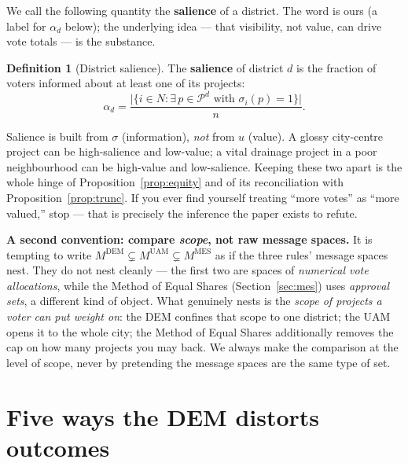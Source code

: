 \documentclass[11pt,letterpaper]{article}
\theoremstyle{definition}
\newtheorem{definition}{Definition}[section]
\theoremstyle{plain}
\theoremstyle{remark}
\newcommand{\Pset}{\mathcal{P}}
\newcommand{\agents}{N}
\newcommand{\DEM}{\text{DEM}}
\newcommand{\UAM}{\text{UAM}}
\newcommand{\MES}{\text{MES}}
\newcommand{\salience}{\alpha}
\begin{document}
\begin{naming}
We call the following quantity the \textbf{salience} of a district. The word is ours (a label for
$\salience_d$ below); the underlying idea --- that visibility, not value, can drive vote totals --- is
the substance.
\end{naming}

\begin{definition}[District salience]
\label{def:salience}
The \textbf{salience} of district $d$ is the fraction of voters informed about at least one of its
projects:
\[
  \salience_d=\frac{\bigl|\{i\in\agents:\exists\,p\in\Pset^d\text{ with }\sigma_i(p)=1\}\bigr|}{n}.
\]
\end{definition}

\begin{watchout}
Salience is built from $\sigma$ (information), \emph{not} from $u$ (value). A glossy city-centre
project can be high-salience and low-value; a vital drainage project in a poor neighbourhood can be
high-value and low-salience. Keeping these two apart is the whole hinge of Proposition~\ref{prop:equity}
and of its reconciliation with Proposition~\ref{prop:trunc}. If you ever find yourself treating
``more votes'' as ``more valued,'' stop --- that is precisely the inference the paper exists to refute.
\end{watchout}

\begin{aside}\small
\textbf{A second convention: compare \emph{scope}, not raw message spaces.} It is tempting to write
$M^{\DEM}\subsetneq M^{\UAM}\subsetneq M^{\MES}$ as if the three rules' message spaces nest. They do
not nest cleanly --- the first two are spaces of \emph{numerical vote allocations}, while the Method
of Equal Shares (Section~\ref{sec:mes}) uses \emph{approval sets}, a different kind of object. What
genuinely nests is the \emph{scope of projects a voter can put weight on}: the DEM confines that
scope to one district; the UAM opens it to the whole city; the Method of Equal Shares additionally
removes the cap on how many projects you may back. We always make the comparison at the level of
scope, never by pretending the message spaces are the same type of set.
\end{aside}

\section{Five ways the DEM distorts outcomes}
\label{sec:distortions}
\end{document}
